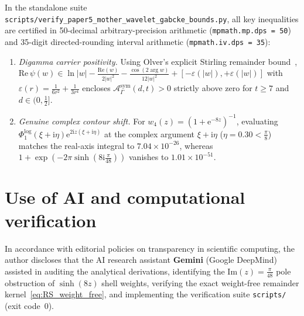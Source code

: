 \documentclass[11pt,reqno]{amsart}
\theoremstyle{definition}
\theoremstyle{remark}
\numberwithin{equation}{section}
\newcommand{\ii}{\mathrm{i}}
\newcommand{\ee}{\mathrm{e}}
\newcommand{\Rea}{\mathrm{Re}}
\newcommand{\Ima}{\mathrm{Im}}
\begin{document}
{\sloppy
In the standalone suite \texttt{scripts/verify\_paper5\_mother\_wavelet\_gabcke\_bounds.py}, all key inequalities are certified in 50-decimal arbitrary-precision arithmetic (\texttt{mpmath.mp.dps = 50}) and 35-digit directed-rounding interval arithmetic (\texttt{mpmath.iv.dps = 35}):\par}
\begin{enumerate}[label=\textup{(\arabic*)},leftmargin=2.2em]
\item \textit{Digamma carrier positivity.} Using Olver's explicit Stirling remainder bound~\cite[Ch.~8]{olver1997}, $\Rea\,\psi(w) \in \ln\lvert w\rvert - \frac{\Rea(w)}{2\lvert w\rvert^2} - \frac{\cos(2\arg w)}{12\lvert w\rvert^2} + [-\varepsilon(\lvert w\rvert), +\varepsilon(\lvert w\rvert)]$ with $\varepsilon(r) = \frac{1}{6r^2} + \frac{1}{3r^4}$ encloses $\mathcal{A}_\Gamma^{\mathrm{sym}}(d,t) > 0$ strictly above zero for $t \ge 7$ and $d \in (0, \frac{1}{2}]$.
\item \textit{Genuine complex contour shift.} For $w_4(z) = (1 + \ee^{-8z})^{-1}$, evaluating $\Phi_1^{\mathrm{log}}(\xi + \ii\eta)\ee^{2\ii z(\xi+\ii\eta)}$ at the complex argument $\xi + \ii\eta$ ($\eta = 0.30 < \frac{\pi}{8}$) matches the real-axis integral to $7.04 \times 10^{-26}$, whereas $1 + \exp(-2\pi\sinh(8\ii\frac{\pi}{48}))$ vanishes to $1.01 \times 10^{-51}$.
\end{enumerate}

\section*{Use of AI and computational verification}

{\sloppy
In accordance with editorial policies on transparency in scientific computing, the author discloses that the AI research assistant \textbf{Gemini} (Google DeepMind) assisted in auditing the analytical derivations, identifying the $\Ima(z) = \frac{\pi}{48}$ pole obstruction of $\sinh(8z)$ shell weights, verifying the exact weight-free remainder kernel~\eqref{eq:RS_weight_free}, and implementing the verification suite \texttt{scripts/}\allowbreak\texttt{} (exit code~$0$).\par}
\end{document}
